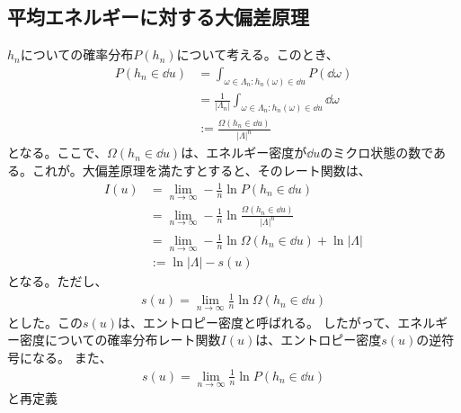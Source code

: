 \documentclass[a4paper,11pt]{jsarticle}
\numberwithin{equation}{section}
\begin{document}
\subsection{平均エネルギーに対する大偏差原理}
$h_{n}$についての確率分布$P(h_{n})$について考える。このとき、
\begin{align}
    P(h_{n}\in \dd{u}) &= \int_{\omega \in \Lambda_n: h_{n}(\omega) \in \dd{u}} P(\dd{\omega})\\
    &= \frac{1}{|\Lambda_n|} \int_{\omega \in \Lambda_n: h_{n}(\omega) \in \dd{u}} \dd{\omega}\\
    &:= \frac{\Omega(h_{n}\in \dd{u})}{|\Lambda|^n}
\end{align}
となる。ここで、$\Omega(h_{n}\in \dd{u})$は、エネルギー密度が$\dd{u}$のミクロ状態の数である。これが。大偏差原理を満たすとすると、そのレート関数は、
\begin{align}
    I(u) &=  \lim_{n \to \infty} -\frac{1}{n} \ln P(h_{n}\in \dd{u})\\\
    &= \lim_{n \to \infty} -\frac{1}{n} \ln \frac{\Omega(h_{n}\in \dd{u})}{|\Lambda|^n}\\
    &=  \lim_{n \to \infty} -\frac{1}{n} \ln \Omega(h_{n}\in \dd{u}) + \ln |\Lambda|\\
    &:= \ln |\Lambda| - s(u)
\end{align}
となる。ただし、
\begin{align}
    s(u) = \lim_{n \to \infty} \frac{1}{n} \ln \Omega(h_{n}\in \dd{u})
\end{align}
とした。この$s(u)$は、エントロピー密度と呼ばれる。
したがって、エネルギー密度についての確率分布レート関数$I(u)$は、エントロピー密度$s(u)$の逆符号になる。
また、
\begin{align}
    s(u) = \lim_{n \to \infty} \frac{1}{n} \ln P(h_{n}\in \dd{u})
\end{align}
と再定義
\end{document}
